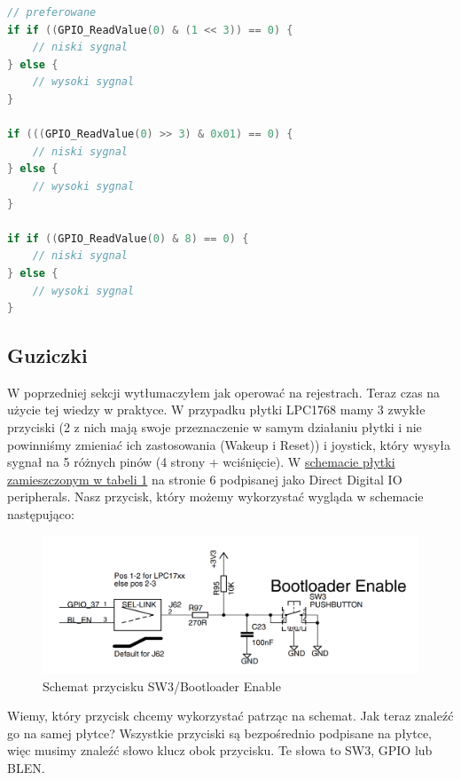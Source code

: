 \documentclass[11pt]{article}
\begin{document}
\begin{lstlisting}[language=c]
// preferowane
if if ((GPIO_ReadValue(0) & (1 << 3)) == 0) {
    // niski sygnal
} else {
    // wysoki sygnal
}

if (((GPIO_ReadValue(0) >> 3) & 0x01) == 0) {
    // niski sygnal
} else {
    // wysoki sygnal
}

if if ((GPIO_ReadValue(0) & 8) == 0) {
    // niski sygnal
} else {
    // wysoki sygnal
}
\end{lstlisting}
\subsection{Guziczki}
W poprzedniej sekcji wytłumaczyłem jak operować na rejestrach. Teraz czas na
użycie tej wiedzy w praktyce. W przypadku płytki LPC1768 mamy 3 zwykłe przyciski 
(2 z nich mają swoje przeznaczenie w samym działaniu płytki i nie powinniśmy 
zmieniać ich zastosowania (Wakeup i Reset))
i joystick, który wysyła sygnał na 5 różnych pinów (4 strony + wciśnięcie). W 
\hyperref[tab:tab1]{schemacie płytki zamieszczonym w tabeli 1} na stronie 6 podpisanej
jako Direct Digital IO peripherals. Nasz przycisk, który możemy wykorzystać wygląda 
w schemacie następująco:

\begin{figure}[H]
\includegraphics[width=\textwidth]{GPIO_btn.png}
\caption{Schemat przycisku SW3/Bootloader Enable}
\end{figure}

Wiemy, który przycisk chcemy wykorzystać patrząc na schemat. Jak teraz znaleźć go na
samej płytce? Wszystkie przyciski są bezpośrednio podpisane na płytce, więc musimy znaleźć
słowo klucz obok przycisku. Te słowa to SW3, GPIO lub BL\textunderscore EN.
\end{document}
